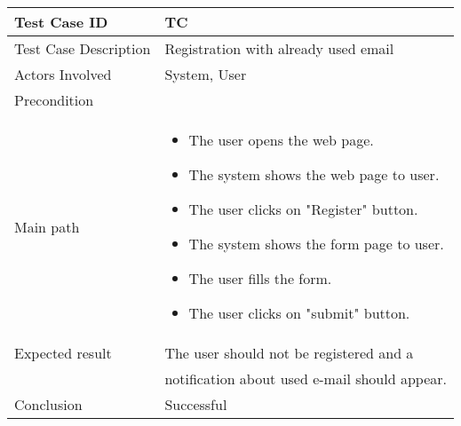 \begin{center} \begin{tabular}{|l|l|}
  \hline
  Test Case ID & TC \z\\
  \hline
  Test Case Description & Registration with already used email \\
  \hline
  Actors Involved & System, User\\
   \hline
  Precondition & \\
  \hline
  Main path &   \begin{minipage}{5in}
    \vskip 4pt
            \begin{itemize}
              \item The user opens the web page.
              \item The system shows the web page to user.
              \item The user clicks on "Register" button.
              \item The system shows the form page to user.
              \item The user fills the form.
              \item The user clicks on "submit" button.
            \end{itemize}
    \vskip 4pt
  \end{minipage}  \\
  \hline
  Expected result & The user should not be registered and a\\
  & notification about used e-mail should appear.\\
  \hline
  Conclusion & Successful\\
  \hline
\end{tabular} \end{center}


